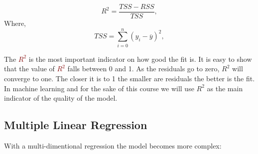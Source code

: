 \documentclass{tufte-handout}
\newcommand{\hlred}[1]{\textcolor{Maroon}{#1}}%
\begin{document}
\begin{equation}
    R^2 = \frac{TSS - RSS}{TSS},
\end{equation}
Where,
\begin{equation}
    TSS = \sum_{i=0}^{n}(y_i-\overline{y})^2,
\end{equation}

 The \hlred{\(R^2\)} is the most important indicator on how good the fit is. It is easy to show that the value of \hlred{\(R^2\)} falls between 0 and 1. As the residuals go to zero, \(R^2\) will converge to one. The closer it is to 1 the smaller are residuals the better is the fit. In machine learning and for the sake of this course we will use \(R^2\) as the main indicator of the quality of the model. 

\subsection{Multiple Linear Regression}

With a multi-dimentional regression the model becomes more complex:
\end{document}
